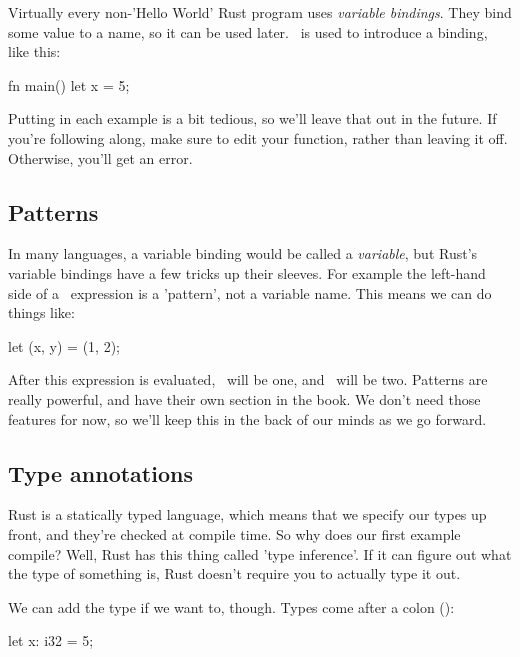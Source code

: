 Virtually every non-'Hello World' Rust program uses \emph{variable bindings}. They bind some value to a name, so it can be used 
later. \keylet\ is used to introduce a binding, like this:

\begin{rustc}
fn main() {
    let x = 5;
}
\end{rustc}

Putting  in each example is a bit tedious, so we'll leave that out in the future. If you're following along, 
make sure to edit your  function, rather than leaving it off. Otherwise, you'll get an error.

\subsection*{Patterns}

In many languages, a variable binding would be called a \emph{variable}, but Rust's variable bindings have a few tricks up 
their sleeves. For example the left-hand side of a \keylet\ expression is a 'pattern', not a variable name. This means we can 
do things like:

\begin{rustc}
let (x, y) = (1, 2);
\end{rustc}

After this expression is evaluated, \x\ will be one, and \y\ will be two. Patterns are really powerful, and have their 
own section in the book. We don't need those features for now, so we'll keep this in the back of our minds as we go forward.

\subsection*{Type annotations}

Rust is a statically typed language, which means that we specify our types up front, and they're checked at compile time. So why 
does our first example compile? Well, Rust has this thing called 'type inference'. If it can figure out what the type of something
is, Rust doesn't require you to actually type it out.

\blank

We can add the type if we want to, though. Types come after a colon (\code{:}):

\begin{rustc}
let x: i32 = 5;
\end{rustc}

